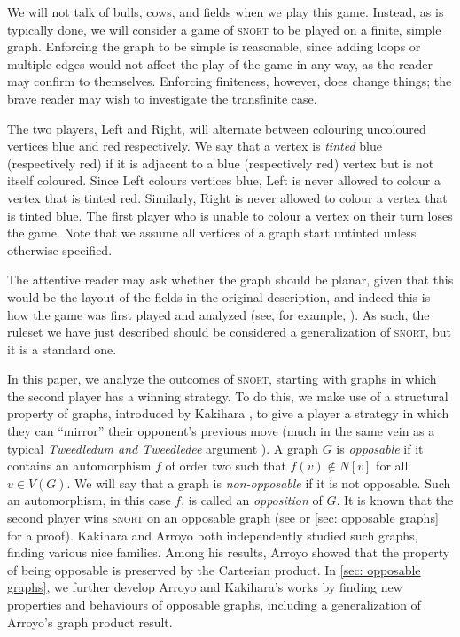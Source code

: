 \documentclass[11pt]{article}
\theoremstyle{definition}
\begin{document}
We will not talk of bulls, cows, and fields when we play this game. Instead, as
is typically done, we will consider a game of \textsc{snort} to be played on a
finite, simple graph. Enforcing the graph to be simple is reasonable, since
adding loops or multiple edges would not affect the play of the game in any
way, as the reader may confirm to themselves. Enforcing finiteness, however,
does change things; the brave reader may wish to investigate the transfinite
case.

The two players, Left and Right, will alternate between colouring uncoloured
vertices blue and red respectively. We say that a vertex is \emph{tinted} blue
(respectively red) if it is adjacent to a blue (respectively red) vertex but is
not itself coloured. Since Left colours vertices blue, Left is never allowed to
colour a vertex that is tinted red. Similarly, Right is never allowed to colour
a vertex that is tinted blue. The first player who is unable to colour a vertex
on their turn loses the game. Note that we assume all vertices of a graph start
untinted unless otherwise specified.

The attentive reader may ask whether the graph should be planar, given that
this would be the layout of the fields in the original description, and indeed
this is how the game was first played and analyzed (see, for example,
\cite[p.~91]{conway:onag}). As such, the ruleset we have just described should
be considered a generalization of \textsc{snort}, but it is a standard one.

In this paper, we analyze the outcomes of \textsc{snort}, starting with graphs
in which the second player has a winning strategy. To do this, we make use of a
structural property of graphs, introduced by Kakihara \cite{kakihara:snort}, to
give a player a strategy in which they can ``mirror'' their opponent's previous
move (much in the same vein as a typical \emph{Tweedledum and Tweedledee}
argument \cite[p.~3]{berlekamp.conway.guy:wwv1}). A graph $G$ is
\emph{opposable} if it contains an automorphism $f$ of order two such that
$f(v)\notin N[v]$ for all $v\in V(G)$. We will say that a graph is
\emph{non-opposable} if it is not opposable. Such an automorphism, in this case
$f$, is called an \emph{opposition} of $G$. It is known that the second player
wins \textsc{snort} on an opposable graph (see \cite[Proposition 3.6 on
p.~24]{kakihara:snort} or \cref{sec: opposable graphs} for a proof). Kakihara
\cite{kakihara:snort} and Arroyo \cite{arroyo:dawsons} both independently
studied such graphs, finding various nice families. Among his results, Arroyo
\cite{arroyo:dawsons} showed that the property of being opposable is preserved
by the Cartesian product. In \cref{sec: opposable graphs}, we further develop
Arroyo and Kakihara's works by finding new properties and behaviours of
opposable graphs, including a generalization of Arroyo's graph product result.
\end{document}
